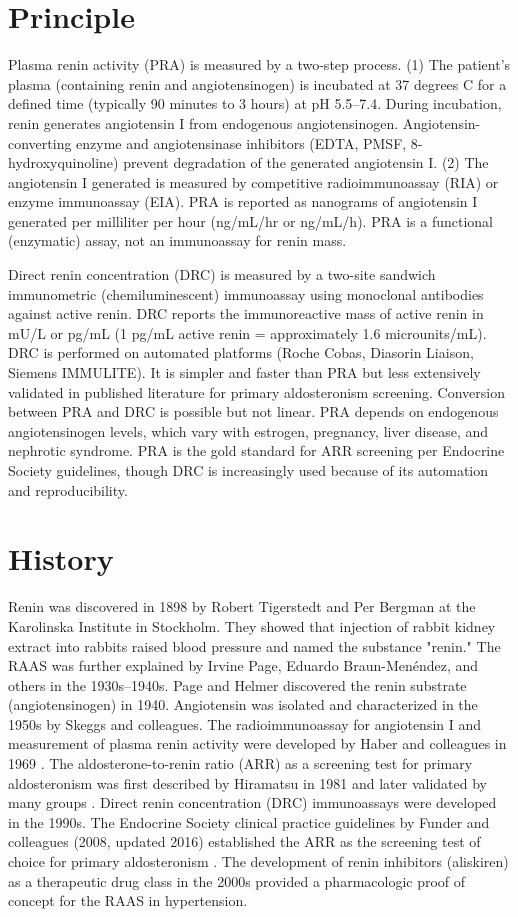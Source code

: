 \section*{Principle}
Plasma renin activity (PRA) is measured by a two-step process. (1) The patient's plasma (containing renin and angiotensinogen) is incubated at 37 degrees C for a defined time (typically 90 minutes to 3 hours) at pH 5.5--7.4. During incubation, renin generates angiotensin I from endogenous angiotensinogen. Angiotensin-converting enzyme and angiotensinase inhibitors (EDTA, PMSF, 8-hydroxyquinoline) prevent degradation of the generated angiotensin I. (2) The angiotensin I generated is measured by competitive radioimmunoassay (RIA) or enzyme immunoassay (EIA). PRA is reported as nanograms of angiotensin I generated per milliliter per hour (ng/mL/hr or ng/mL/h). PRA is a functional (enzymatic) assay, not an immunoassay for renin mass.

Direct renin concentration (DRC) is measured by a two-site sandwich immunometric (chemiluminescent) immunoassay using monoclonal antibodies against active renin. DRC reports the immunoreactive mass of active renin in mU/L or pg/mL (1 pg/mL active renin = approximately 1.6 microunits/mL). DRC is performed on automated platforms (Roche Cobas, Diasorin Liaison, Siemens IMMULITE). It is simpler and faster than PRA but less extensively validated in published literature for primary aldosteronism screening. Conversion between PRA and DRC is possible but not linear. PRA depends on endogenous angiotensinogen levels, which vary with estrogen, pregnancy, liver disease, and nephrotic syndrome. PRA is the gold standard for ARR screening per Endocrine Society guidelines, though DRC is increasingly used because of its automation and reproducibility.

\section*{History}
Renin was discovered in 1898 by Robert Tigerstedt and Per Bergman at the Karolinska Institute in Stockholm. They showed that injection of rabbit kidney extract into rabbits raised blood pressure and named the substance "renin." \cite{tigerstedt1898niere} The RAAS was further explained by Irvine Page, Eduardo Braun-Menéndez, and others in the 1930s--1940s. Page and Helmer discovered the renin substrate (angiotensinogen) in 1940. Angiotensin was isolated and characterized in the 1950s by Skeggs and colleagues. The radioimmunoassay for angiotensin I and measurement of plasma renin activity were developed by Haber and colleagues in 1969 \cite{haber1969application}. The aldosterone-to-renin ratio (ARR) as a screening test for primary aldosteronism was first described by Hiramatsu in 1981 and later validated by many groups \cite{young2007primary}. Direct renin concentration (DRC) immunoassays were developed in the 1990s. The Endocrine Society clinical practice guidelines by Funder and colleagues (2008, updated 2016) established the ARR as the screening test of choice for primary aldosteronism \cite{funder2016management}. The development of renin inhibitors (aliskiren) as a therapeutic drug class in the 2000s provided a pharmacologic proof of concept for the RAAS in hypertension.

